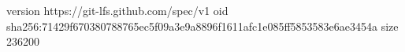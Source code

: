 version https://git-lfs.github.com/spec/v1
oid sha256:71429f670380788765ec5f09a3e9a8896f1611afc1e085ff5853583e6ae3454a
size 236200
